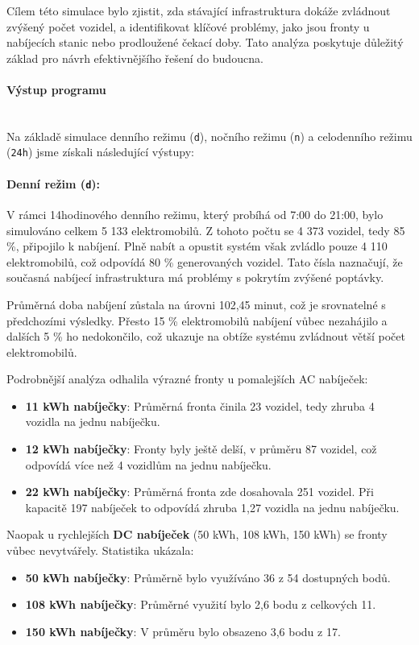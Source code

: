 \documentclass[a4paper,11pt]{article}
\begin{document}
Cílem této simulace bylo zjistit, zda stávající infrastruktura dokáže zvládnout zvýšený počet vozidel, a identifikovat klíčové problémy, jako jsou fronty u nabíjecích stanic nebo prodloužené čekací doby. Tato analýza poskytuje důležitý základ pro návrh efektivnějšího řešení do budoucna.


\paragraph{Výstup programu\\\\}
Na základě simulace denního režimu (\texttt{d}), nočního režimu (\texttt{n}) a celodenního režimu (\texttt{24h}) jsme získali následující výstupy:

\paragraph{Denní režim (\texttt{d}):} 
V rámci 14hodinového denního režimu, který probíhá od 7:00 do 21:00, bylo simulováno celkem 5 133 elektromobilů. Z tohoto počtu se 4 373 vozidel, tedy 85 \%, připojilo k nabíjení. Plně nabít a opustit systém však zvládlo pouze 4 110 elektromobilů, což odpovídá 80 \% generovaných vozidel. Tato čísla naznačují, že současná nabíjecí infrastruktura má problémy s pokrytím zvýšené poptávky.

Průměrná doba nabíjení zůstala na úrovni 102,45 minut, což je srovnatelné s předchozími výsledky. Přesto 15 \% elektromobilů nabíjení vůbec nezahájilo a dalších 5 \% ho nedokončilo, což ukazuje na obtíže systému zvládnout větší počet elektromobilů.

Podrobnější analýza odhalila výrazné fronty u pomalejších AC nabíječek:
\begin{itemize}
    \item \textbf{11 kWh nabíječky}: Průměrná fronta činila 23 vozidel, tedy zhruba 4 vozidla na jednu nabíječku.
    \item \textbf{12 kWh nabíječky}: Fronty byly ještě delší, v průměru 87 vozidel, což odpovídá více než 4 vozidlům na jednu nabíječku.
    \item \textbf{22 kWh nabíječky}: Průměrná fronta zde dosahovala 251 vozidel. Při kapacitě 197 nabíječek to odpovídá zhruba 1,27 vozidla na jednu nabíječku.
\end{itemize}

Naopak u rychlejších \textbf{DC nabíječek} (50 kWh, 108 kWh, 150 kWh) se fronty vůbec nevytvářely. Statistika ukázala:
\begin{itemize}
    \item \textbf{50 kWh nabíječky}: Průměrně bylo využíváno 36 z 54 dostupných bodů.
    \item \textbf{108 kWh nabíječky}: Průměrné využití bylo 2,6 bodu z celkových 11.
    \item \textbf{150 kWh nabíječky}: V průměru bylo obsazeno 3,6 bodu z 17.
\end{itemize}
\end{document}
